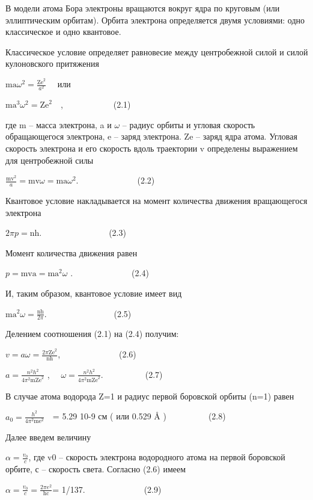 \documentclass[a4paper,14pt, openany, twoside, draft]{extbook} %
\begin{document}
В модели атома Бора электроны вращаются вокруг ядра по круговым (или эллиптическим орбитам). Орбита электрона определяется двумя условиями: одно классическое и одно квантовое.

Классическое условие определяет равновесие между центробежной силой и силой кулоновского притяжения

 ${\text{ma}}\omega ^2=\frac{{\text{Ze}}^2}{a^2}$ \ \ или \ \ \ \ \ \ \ \ \ \ \ \

 ${\text{ma}}^3\omega ^2={\text{Ze}}^2$\ \ ,\ \ \ \ \ \ \ \ \ \ \ \ (2.1)

где m – масса электрона, a и ${\omega}$ – радиус орбиты и угловая скорость обращающегося электрона, e – заряд электрона. Ze – заряд ядра атома. Угловая скорость электрона и его скорость  вдоль траектории v определены выражением для центробежной силы

 $\frac{{\text{mv}}^2} a={\text{mv}}\omega ={\text{ma}}\omega ^2$.\ \ \ \ \ \ \ \ \ \ \ \ \ \ (2.2)

Квантовое условие накладывается на момент количества движения вращающегося электрона

 $2\mathit{\pi p}={\text{nh}}$.\ \ \ \ \ \ \ \ \ \ \ \ \ \ \ \ (2.3)

Момент количества движения равен

 $p={\text{mva}}={\text{ma}}^2\omega $ .\ \ \ \ \ \ \ \ \ \ \ \ \ \ (2.4)

И, таким образом, квантовое условие имеет вид

 ${\text{ma}}^2\omega =\frac{{\text{nh}}}{2\pi }$.\ \ \ \ \ \ \ \ \ \ \ \ \ \ \ \ (2.5)

Делением соотношения (2.1) на (2.4) получим:

 $v=\mathit{a\omega }=\frac{2\pi {\text{Ze}}^2}{{\text{nh}}}$,\ \ \ \ \ \ \ \ \ \ \ \ \ \ (2.6)

 $a=\frac{n^2h^2}{4\pi ^2{\text{mZe}}^2}$ , \ \  $\omega =\frac{n^2h^2}{4\pi ^2{\text{mZe}}^2}$.\ \ \ \ \ \ \ \ \ \ (2.7)

В случае атома водорода Z=1 и радиус первой боровской орбиты (n=1) равен

 $a_0=\frac{h^2}{4\pi ^2{\text{me}}^2}$\ \ = 5.29 10{}-9 см ( или 0.529 Å )\ \ \ \ \ \ \ \ \ \ (2.8)

Далее введем величину

 $\alpha =\frac{v_0} c$, где v0 – скорость электрона водородного атома на первой боровской орбите, с – скорость света. Согласно (2.6) имеем

 $\alpha =\frac{v_0} c=\frac{2\mathit{\pi e}^2}{{\text{hc}}}$= 1/137.\ \ \ \ \ \ \ \ \ \ \ \ \ \ (2.9)
\end{document}
